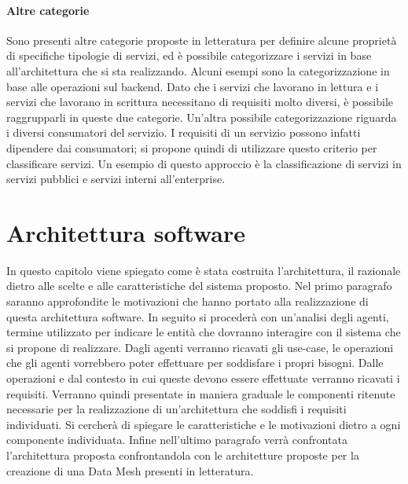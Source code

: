 \documentclass[12pt]{report}
\begin{document}
\subsubsection{Altre categorie}
Sono presenti altre categorie proposte in letteratura per definire alcune proprietà di specifiche tipologie di servizi, ed è possibile categorizzare i servizi in base all'architettura che si sta realizzando. 
Alcuni esempi sono la categorizzazione in base alle operazioni sul backend. 
Dato che i servizi che lavorano in lettura e i servizi che lavorano in scrittura necessitano di requisiti molto diversi, è possibile raggrupparli in queste due categorie.
Un'altra possibile categorizzazione riguarda i diversi consumatori del servizio. 
I requisiti di un servizio possono infatti dipendere dai consumatori; si propone quindi di utilizzare questo criterio per classificare servizi. 
Un esempio di questo approccio è la classificazione di servizi in servizi pubblici e  servizi interni all'enterprise.

\chapter{Architettura software}\label{architetturaLogica}
In questo capitolo viene spiegato come è stata costruita l'architettura, il razionale dietro alle scelte e alle caratteristiche del sistema proposto. 
Nel primo paragrafo saranno approfondite le motivazioni che hanno portato alla realizzazione di questa architettura software.
In seguito si procederà con un'analisi degli agenti, termine utilizzato per indicare le entità che dovranno interagire con il sistema che si propone di realizzare.
Dagli agenti verranno ricavati gli use-case, le operazioni che gli agenti vorrebbero poter effettuare per soddisfare i propri bisogni.
Dalle operazioni e dal contesto in cui queste devono essere effettuate verranno ricavati i requisiti.
Verranno quindi presentate in maniera graduale le componenti ritenute necessarie per la realizzazione di un'architettura che soddisfi i requisiti individuati. 
Si cercherà di spiegare le caratteristiche e le motivazioni dietro a ogni componente individuata.
Infine nell'ultimo paragrafo verrà confrontata l'architettura proposta confrontandola con le architetture proposte per la creazione di una Data Mesh presenti in letteratura.
\end{document}
